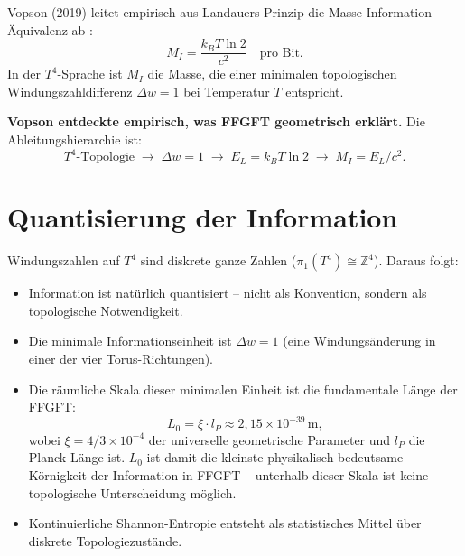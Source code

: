 Vopson (2019) leitet empirisch aus Landauers Prinzip die
Masse-Information-Äquivalenz ab \cite{Vopson2019}:
\begin{equation}
  M_I = \frac{k_B T \ln 2}{c^2} \quad \text{pro Bit.}
  \label{eq:vopson}
\end{equation}
In der \(T^4\)-Sprache ist \(M_I\) die Masse,
die einer minimalen topologischen Windungszahldifferenz
\(\Delta w = 1\) bei Temperatur \(T\) entspricht.

\textbf{Vopson entdeckte empirisch, was FFGFT geometrisch erklärt.}
Die Ableitungshierarchie ist:
\begin{equation}
  T^4\text{-Topologie} \;\longrightarrow\;
  \Delta w = 1 \;\longrightarrow\;
  E_L = k_B T \ln 2 \;\longrightarrow\;
  M_I = E_L / c^2.
\end{equation}

\section{Quantisierung der Information}

Windungszahlen auf \(T^4\) sind diskrete ganze Zahlen
(\(\pi_1(T^4) \cong \mathbb{Z}^4\)).
Daraus folgt:

\begin{itemize}
  \item Information ist natürlich quantisiert --
        nicht als Konvention, sondern als topologische Notwendigkeit.
  \item Die minimale Informationseinheit ist \(\Delta w = 1\)
        (eine Windungsänderung in einer der vier Torus-Richtungen).
  \item Die räumliche Skala dieser minimalen Einheit ist die
        fundamentale Länge der FFGFT:
        \begin{equation}
          L_0 = \xi \cdot l_P \approx 2{,}15 \times 10^{-39}\,\text{m},
        \end{equation}
        wobei \(\xi = 4/3 \times 10^{-4}\) der universelle geometrische
        Parameter und \(l_P\) die Planck-Länge ist.
        \(L_0\) ist damit die kleinste physikalisch bedeutsame
        Körnigkeit der Information in FFGFT -- unterhalb dieser
        Skala ist keine topologische Unterscheidung möglich.
  \item Kontinuierliche Shannon-Entropie entsteht als statistisches
        Mittel über diskrete Topologiezustände.
\end{itemize}

